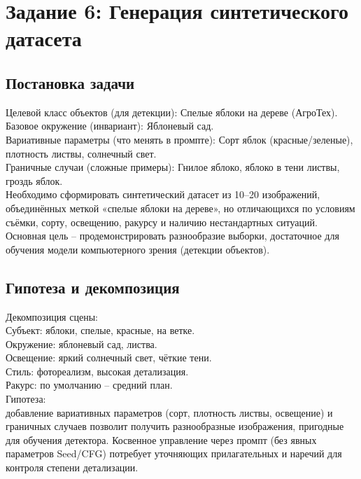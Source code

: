\newpage
\section*{Задание 6: Генерация синтетического датасета}
\subsection{Постановка задачи}
\noindent
Целевой класс объектов (для детекции): Спелые яблоки на дереве (АгроТех).\\
Базовое окружение (инвариант): Яблоневый сад.\\
Вариативные параметры (что менять в промпте): Сорт яблок (красные/зеленые), плотность листвы, солнечный свет.\\
Граничные случаи (сложные примеры): Гнилое яблоко, яблоко в тени листвы, гроздь яблок.\\
\newline
\indent
Необходимо сформировать синтетический датасет из 10–20 изображений, объединённых меткой «спелые яблоки на дереве», но отличающихся по условиям съёмки, сорту, освещению, ракурсу и наличию нестандартных ситуаций. Основная цель – продемонстрировать разнообразие выборки, достаточное для обучения модели компьютерного зрения (детекции объектов).
\newline
\subsection{Гипотеза и декомпозиция}
\indent Декомпозиция сцены: \\
Субъект: яблоки, спелые, красные, на ветке. \\
Окружение: яблоневый сад, листва.\\
Освещение: яркий солнечный свет, чёткие тени.\\
Стиль: фотореализм, высокая детализация.\\
Ракурс: по умолчанию – средний план.\\
\newpage
\indent Гипотеза: \\
добавление вариативных параметров (сорт, плотность листвы, освещение) и граничных случаев позволит получить разнообразные изображения, пригодные для обучения детектора. Косвенное управление через промпт (без явных параметров Seed/CFG) потребует уточняющих прилагательных и наречий для контроля степени детализации.
